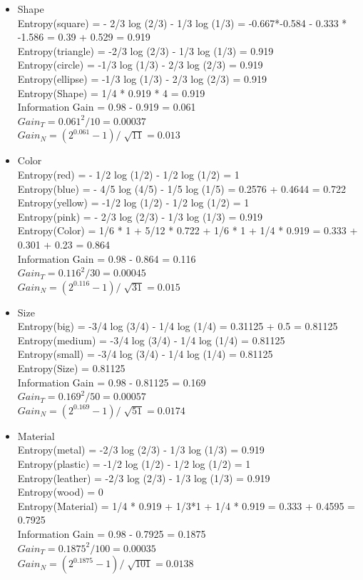 \documentclass[12pt, fullpage,letterpaper]{article}
\begin{document}
\begin{enumerate}
\begin{itemize}
\item Shape\\
Entropy(square) = - 2/3 log (2/3) - 1/3 log (1/3) = -0.667*-0.584 - 0.333 * -1.586 = 0.39 + 0.529 = 0.919\\
Entropy(triangle) = -2/3 log (2/3) - 1/3 log (1/3) = 0.919\\
Entropy(circle) = -1/3 log (1/3) - 2/3 log (2/3) = 0.919\\
Entropy(ellipse) = -1/3 log (1/3) - 2/3 log (2/3) = 0.919\\
Entropy(Shape) = 1/4 * 0.919 * 4 = 0.919\\
Information Gain = 0.98 - 0.919 = 0.061\\
$Gain_T = 0.061^2 / 10 = 0.00037$\\
$Gain_N = (2^{0.061}-1)/\sqrt[]{11} = 0.013$
\item Color\\
Entropy(red) =  - 1/2 log (1/2) - 1/2 log (1/2) = 1\\
Entropy(blue) = - 4/5 log (4/5) - 1/5 log (1/5) = 0.2576 + 0.4644 = 0.722\\
Entropy(yellow) = -1/2 log (1/2) - 1/2 log (1/2) = 1\\
Entropy(pink) = - 2/3 log (2/3) - 1/3 log (1/3) = 0.919\\
Entropy(Color) = 1/6 * 1 + 5/12 * 0.722 + 1/6 * 1 + 1/4 * 0.919 = 0.333 + 0.301 + 0.23 = 0.864\\
Information Gain = 0.98 - 0.864 = 0.116\\
$Gain_T = 0.116^2 / 30 = 0.00045$\\
$Gain_N = (2^{0.116}-1)/\sqrt[]{31} = 0.015$
\item Size\\
Entropy(big) = -3/4 log (3/4) - 1/4 log (1/4) = 0.31125 + 0.5 = 0.81125\\
Entropy(medium) = -3/4 log (3/4) - 1/4 log (1/4) = 0.81125\\
Entropy(small) = -3/4 log (3/4) - 1/4 log (1/4) = 0.81125 \\
Entropy(Size) = 0.81125\\
Information Gain = 0.98 - 0.81125 = 0.169\\
$Gain_T = 0.169^2 / 50 = 0.00057$\\
$Gain_N = (2^{0.169}-1)/\sqrt[]{51} = 0.0174$
\item Material\\
Entropy(metal) = -2/3 log (2/3) - 1/3 log (1/3) = 0.919\\
Entropy(plastic) = -1/2 log (1/2) - 1/2 log (1/2) = 1\\
Entropy(leather) = -2/3 log (2/3) - 1/3 log (1/3) = 0.919\\
Entropy(wood) = 0\\
Entropy(Material) = 1/4 * 0.919 + 1/3*1 + 1/4 * 0.919 = 0.333 + 0.4595 = 0.7925\\
Information Gain = 0.98 - 0.7925 = 0.1875\\
$Gain_T = 0.1875^2 / 100 = 0.00035$\\
$Gain_N = (2^{0.1875}-1)/\sqrt[]{101} = 0.0138$


\end{itemize}
\end{enumerate}
\end{document}
